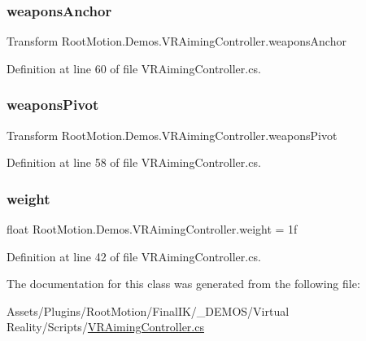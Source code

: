 \subsubsection{\texorpdfstring{weapons\+Anchor}{weaponsAnchor}}
{\footnotesize\ttfamily Transform Root\+Motion.\+Demos.\+V\+R\+Aiming\+Controller.\+weapons\+Anchor}



Definition at line 60 of file V\+R\+Aiming\+Controller.\+cs.

\mbox{\label{class_root_motion_1_1_demos_1_1_v_r_aiming_controller_afa0172fdd1f8cf9ebee12261c514f0b8}} 
\subsubsection{\texorpdfstring{weapons\+Pivot}{weaponsPivot}}
{\footnotesize\ttfamily Transform Root\+Motion.\+Demos.\+V\+R\+Aiming\+Controller.\+weapons\+Pivot}



Definition at line 58 of file V\+R\+Aiming\+Controller.\+cs.

\mbox{\label{class_root_motion_1_1_demos_1_1_v_r_aiming_controller_a3165b535b76344b266cea3ec047fd6e5}} 
\subsubsection{\texorpdfstring{weight}{weight}}
{\footnotesize\ttfamily float Root\+Motion.\+Demos.\+V\+R\+Aiming\+Controller.\+weight = 1f}



Definition at line 42 of file V\+R\+Aiming\+Controller.\+cs.



The documentation for this class was generated from the following file\+:\begin{DoxyCompactItemize}
\item 
Assets/\+Plugins/\+Root\+Motion/\+Final\+I\+K/\+\_\+\+D\+E\+M\+O\+S/\+Virtual Reality/\+Scripts/\mbox{\hyperlink{_v_r_aiming_controller_8cs}{V\+R\+Aiming\+Controller.\+cs}}\end{DoxyCompactItemize}
